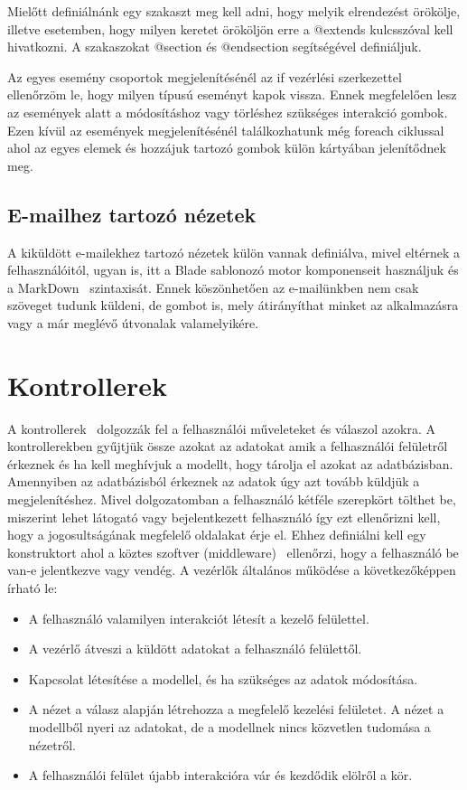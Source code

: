 \documentclass[
]{thesis-ekf}
\theoremstyle{definition}
\theoremstyle{remark}
\begin{document}
Mielőtt definiálnánk egy szakaszt meg kell adni, hogy melyik elrendezést örökölje, illetve esetemben, hogy milyen keretet örököljön erre a @extends kulcsszóval kell hivatkozni. A szakaszokat @section és @endsection segítségével definiáljuk.

Az egyes esemény csoportok megjelenítésénél az if vezérlési szerkezettel ellenőrzöm le, hogy milyen típusú eseményt kapok vissza. Ennek megfelelően lesz az események alatt a módosításhoz vagy törléshez szükséges interakció gombok. Ezen kívül az események megjelenítésénél találkozhatunk még foreach ciklussal ahol az egyes elemek és hozzájuk tartozó gombok külön kártyában jelenítődnek meg. 

\subsection{E-mailhez tartozó nézetek}
A kiküldött e-mailekhez tartozó nézetek külön vannak definiálva, mivel eltérnek a felhasználóitól, ugyan is, itt a Blade sablonozó motor komponenseit használjuk és a MarkDown~\cite{markdown_page} szintaxisát. Ennek köszönhetően az e-mailünkben nem csak szöveget tudunk küldeni, de gombot is, mely átirányíthat minket az alkalmazásra vagy a már meglévő útvonalak valamelyikére.

\section{Kontrollerek}
A kontrollerek~\cite{laravel_controller} dolgozzák fel a felhasználói műveleteket és válaszol azokra. A kontrollerekben gyűjtjük össze azokat az adatokat amik a felhasználói felületről érkeznek és ha kell meghívjuk a modellt, hogy tárolja el azokat az adatbázisban. Amennyiben az adatbázisból érkeznek az adatok úgy azt tovább küldjük a megjelenítéshez. Mivel dolgozatomban a felhasználó kétféle szerepkört tölthet be, miszerint lehet látogató vagy bejelentkezett felhasználó így ezt ellenőrizni kell, hogy a jogosultságának megfelelő oldalakat érje el. Ehhez definiálni kell egy konstruktort ahol a köztes szoftver (middleware)~\cite{laravel_middlewear} ellenőrzi, hogy a felhasználó be van-e jelentkezve vagy vendég.
A vezérlők általános működése a következőképpen írható le:~\cite{controller_cicle}
\begin{itemize}
\item{A felhasználó valamilyen interakciót létesít a kezelő felülettel.}
\item{A vezérlő átveszi a küldött adatokat a felhasználó felülettől.}
\item{Kapcsolat létesítése a modellel, és ha szükséges az adatok módosítása.}
\item{ A nézet a válasz alapján létrehozza a megfelelő kezelési felületet. A nézet a modellből nyeri az adatokat, de a modellnek nincs közvetlen tudomása a nézetről.}
\item{A felhasználói felület újabb interakcióra vár és kezdődik elölről a kör.}
\end{itemize}
\end{document}
